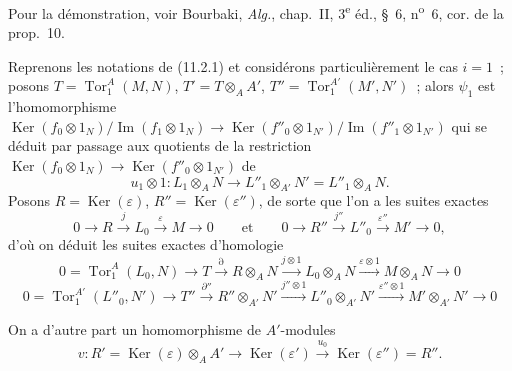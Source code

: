Pour la démonstration, voir Bourbaki, \emph{Alg.}, chap.~II, 3\textsuperscript{e} éd.,
\S~6, n\textsuperscript{o}~6, cor. de la prop.~10.

\begin{env}[11.2.3]
\label{IV.11.2.3-fr}
Reprenons les notations de (11.2.1) et considérons particulièrement le cas
$i=1$~; posons $T=\operatorname{Tor}_1^A(M,N)$, $T'=T\otimes_AA'$,
$T''=\operatorname{Tor}_1^{A'}(M',N')$~; alors $\psi_1$ est
l'homomorphisme
$\operatorname{Ker}(f_0\otimes1_N)/\operatorname{Im}(f_1\otimes1_N)
\to
\operatorname{Ker}(f''_0\otimes1_{N'})/
\operatorname{Im}(f''_1\otimes1_{N'})$
qui se déduit par passage aux quotients de la restriction
$\operatorname{Ker}(f_0\otimes1_N)\to
\operatorname{Ker}(f''_0\otimes1_{N'})$ de
\[
u_1\otimes1:L_1\otimes_AN\to L''_1\otimes_{A'}N'=L''_1\otimes_AN.
\]
Posons $R=\operatorname{Ker}(\varepsilon)$,
$R''=\operatorname{Ker}(\varepsilon'')$, de sorte que l'on a les suites
exactes
\[
0\to R\xrightarrow{j}L_0\xrightarrow{\varepsilon}M\to0
\qquad\text{et}\qquad
0\to R''\xrightarrow{j''}L''_0\xrightarrow{\varepsilon''}M'\to0,
\]
d'où on déduit les suites exactes d'homologie
\begin{equation}
0=\operatorname{Tor}_1^A(L_0,N)\to T\xrightarrow{\partial}R\otimes_AN
\xrightarrow{j\otimes1}L_0\otimes_AN\xrightarrow{\varepsilon\otimes1}
M\otimes_AN\to0
\label{IV.11.2.3.1-fr}
\tag{11.2.3.1}
\end{equation}
\begin{equation}
0=\operatorname{Tor}_1^{A'}(L''_0,N')\to T''\xrightarrow{\partial''}
R''\otimes_{A'}N'\xrightarrow{j''\otimes1}L''_0\otimes_{A'}N'
\xrightarrow{\varepsilon''\otimes1}M'\otimes_{A'}N'\to0
\label{IV.11.2.3.2-fr}
\tag{11.2.3.2}
\end{equation}

On a d'autre part un homomorphisme de $A'$-modules
\[
v:R'=\operatorname{Ker}(\varepsilon)\otimes_AA'
\to\operatorname{Ker}(\varepsilon')\xrightarrow{u_0}
\operatorname{Ker}(\varepsilon'')=R''.
\]
\end{env}


